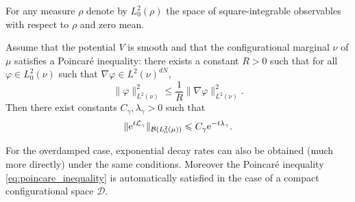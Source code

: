         For any measure $\rho$ denote by $L^2_0(\rho)$ the space of square-integrable observables with respect to $\rho$ and zero mean.
        \begin{prop}
            Assume that the potential $V$ is smooth and that the configurational marginal $\nu$ of $\mu$ satisfies a Poincaré inequality:
            there exists a constant $R>0$ such that for all $\varphi \in L^2_0(\nu)$ such that $\nabla \varphi \in L^2(\nu)^{dN}$,
            \begin{equation}
                \label{eq:poincare_inequality}
                \|\varphi \|_{L^2(\nu)}^2\leq \frac1R \| \nabla \varphi\|^2_{L^2(\nu)}.
            \end{equation}
            Then there exist constants $C_\gamma,\lambda_\gamma >0$ such that 
            \begin{equation}
                \label{eq:semigroup_exp_decay}
                \|\mathrm{e}^{t\mathcal{L}_\gamma}\|_{\mathcal{B}(L_0^2(\mu))}\leqslant C_\gamma \mathrm{e}^{-t\lambda_\gamma}.
            \end{equation}
        \end{prop}
        For the overdamped case, exponential decay rates can also be obtained (much more directly) under the same conditions.
        Moreover the Poincaré inequality \eqref{eq:poincare_inequality} is automatically satisfied in the case of a compact configurational space $\mathcal D$.
        
